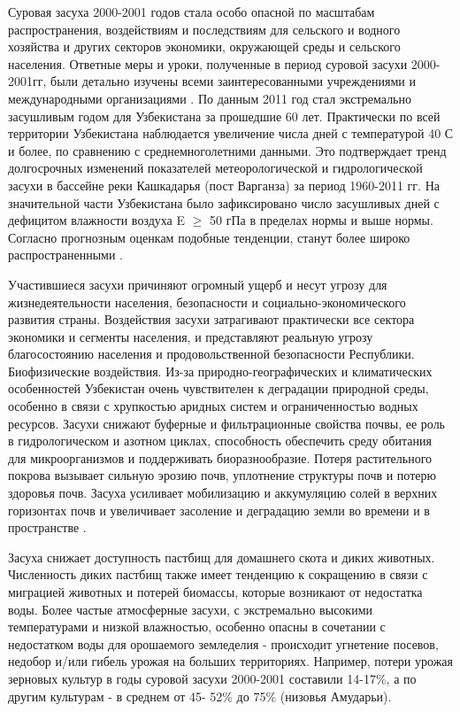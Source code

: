 Суровая засуха 2000-2001 годов стала особо опасной по масштабам распространения, воздействиям и последствиям для сельского и водного хозяйства и других секторов экономики, окружающей среды и сельского населения. Ответные меры и уроки, полученные в период суровой засухи 2000-2001гг, были детально изучены всеми заинтересованными учреждениями и международными организациями \cite{Zasuha2005}.
По данным \cite{Agalceva2012} 2011 год стал экстремально засушливым годом для Узбекистана за прошедшие 60 лет. Практически по всей территории Узбекистана наблюдается увеличение числа дней с температурой 40 \textdegree С и более, по сравнению с среднемноголетними данными. Это подтверждает тренд долгосрочных изменений показателей метеорологической и гидрологической засухи в бассейне реки Кашкадарья (пост Варганза) за период 1960-2011 гг. На значительной части Узбекистана было зафиксировано число засушливых дней с дефицитом влажности воздуха E $\geq$ 50 гПа в пределах нормы и выше нормы. Согласно прогнозным оценкам подобные тенденции, станут более широко распространенными \cite{NatSoob2, NatSoob3}.

Участившиеся засухи причиняют огромный ущерб и несут угрозу для жизнедеятельности населения, безопасности и социально-экономического развития страны. Воздействия засухи затрагивают практически все сектора экономики и сегменты населения, и представляют реальную угрозу благосостоянию населения и продовольственной безопасности Республики.
Биофизические воздействия. Из-за природно-географических и климатических особенностей Узбекистан очень чувствителен к деградации природной среды, особенно в связи с хрупкостью аридных систем и ограниченностью водных ресурсов. 
Засухи снижают буферные и фильтрационные свойства почвы, ее роль в гидрологическом и азотном циклах, способность обеспечить среду обитания для микроорганизмов и поддерживать биоразнообразие. Потеря растительного покрова вызывает сильную эрозию почв, уплотнение структуры почв и потерю здоровья почв. Засуха усиливает мобилизацию и аккумуляцию солей в верхних горизонтах почв и увеличивает засоление и деградацию земли во времени и в пространстве \cite{Zasuha2013}.

Засуха снижает доступность пастбищ для домашнего скота и диких животных. Численность диких пастбищ также имеет тенденцию к сокращению в связи с миграцией животных и потерей биомассы, которые возникают от недостатка воды. 
Более частые атмосферные засухи, с экстремально высокими температурами и низкой влажностью, особенно опасны в сочетании с недостатком воды для орошаемого земледелия - происходит угнетение посевов, недобор и/или гибель урожая на больших территориях. Например, потери урожая зерновых культур в годы суровой засухи 2000-2001 составили 14-17\%, а по другим культурам - в среднем от 45- 52\% до 75\% (низовья Амударьи).


